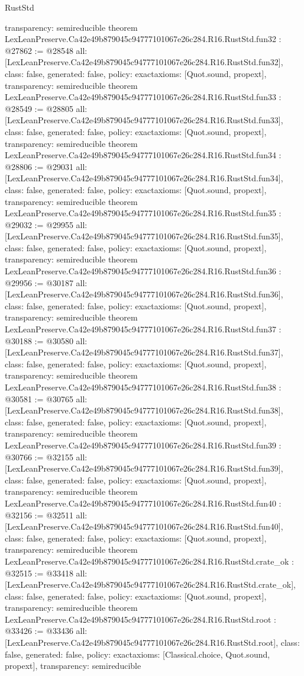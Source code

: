 \begin{lexlean}{RustStd}
\begin{coremodule}
{  transparency: semireducible
}
theorem LexLeanPreserve.Ca42e49b879045c94777101067e26c284.R16.RustStd.fun32 : @27862 := @28548 {
  all: [LexLeanPreserve.Ca42e49b879045c94777101067e26c284.R16.RustStd.fun32],
  class: false,
  generated: false,
  policy: exact{axioms: [Quot.sound, propext]},
  transparency: semireducible
}
theorem LexLeanPreserve.Ca42e49b879045c94777101067e26c284.R16.RustStd.fun33 : @28549 := @28805 {
  all: [LexLeanPreserve.Ca42e49b879045c94777101067e26c284.R16.RustStd.fun33],
  class: false,
  generated: false,
  policy: exact{axioms: [Quot.sound, propext]},
  transparency: semireducible
}
theorem LexLeanPreserve.Ca42e49b879045c94777101067e26c284.R16.RustStd.fun34 : @28806 := @29031 {
  all: [LexLeanPreserve.Ca42e49b879045c94777101067e26c284.R16.RustStd.fun34],
  class: false,
  generated: false,
  policy: exact{axioms: [Quot.sound, propext]},
  transparency: semireducible
}
theorem LexLeanPreserve.Ca42e49b879045c94777101067e26c284.R16.RustStd.fun35 : @29032 := @29955 {
  all: [LexLeanPreserve.Ca42e49b879045c94777101067e26c284.R16.RustStd.fun35],
  class: false,
  generated: false,
  policy: exact{axioms: [Quot.sound, propext]},
  transparency: semireducible
}
theorem LexLeanPreserve.Ca42e49b879045c94777101067e26c284.R16.RustStd.fun36 : @29956 := @30187 {
  all: [LexLeanPreserve.Ca42e49b879045c94777101067e26c284.R16.RustStd.fun36],
  class: false,
  generated: false,
  policy: exact{axioms: [Quot.sound, propext]},
  transparency: semireducible
}
theorem LexLeanPreserve.Ca42e49b879045c94777101067e26c284.R16.RustStd.fun37 : @30188 := @30580 {
  all: [LexLeanPreserve.Ca42e49b879045c94777101067e26c284.R16.RustStd.fun37],
  class: false,
  generated: false,
  policy: exact{axioms: [Quot.sound, propext]},
  transparency: semireducible
}
theorem LexLeanPreserve.Ca42e49b879045c94777101067e26c284.R16.RustStd.fun38 : @30581 := @30765 {
  all: [LexLeanPreserve.Ca42e49b879045c94777101067e26c284.R16.RustStd.fun38],
  class: false,
  generated: false,
  policy: exact{axioms: [Quot.sound, propext]},
  transparency: semireducible
}
theorem LexLeanPreserve.Ca42e49b879045c94777101067e26c284.R16.RustStd.fun39 : @30766 := @32155 {
  all: [LexLeanPreserve.Ca42e49b879045c94777101067e26c284.R16.RustStd.fun39],
  class: false,
  generated: false,
  policy: exact{axioms: [Quot.sound, propext]},
  transparency: semireducible
}
theorem LexLeanPreserve.Ca42e49b879045c94777101067e26c284.R16.RustStd.fun40 : @32156 := @32511 {
  all: [LexLeanPreserve.Ca42e49b879045c94777101067e26c284.R16.RustStd.fun40],
  class: false,
  generated: false,
  policy: exact{axioms: [Quot.sound, propext]},
  transparency: semireducible
}
theorem LexLeanPreserve.Ca42e49b879045c94777101067e26c284.R16.RustStd.crate_ok : @32515 := @33418 {
  all: [LexLeanPreserve.Ca42e49b879045c94777101067e26c284.R16.RustStd.crate_ok],
  class: false,
  generated: false,
  policy: exact{axioms: [Quot.sound, propext]},
  transparency: semireducible
}
theorem LexLeanPreserve.Ca42e49b879045c94777101067e26c284.R16.RustStd.root : @33426 := @33436 {
  all: [LexLeanPreserve.Ca42e49b879045c94777101067e26c284.R16.RustStd.root],
  class: false,
  generated: false,
  policy: exact{axioms: [Classical.choice, Quot.sound, propext]},
  transparency: semireducible
}


\end{coremodule}
\end{lexlean}
